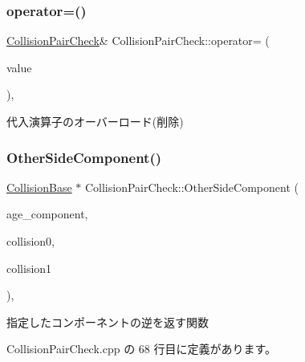 \subsubsection{\texorpdfstring{operator=()}{operator=()}}
{\footnotesize\ttfamily \mbox{\hyperlink{class_collision_pair_check}{Collision\+Pair\+Check}}\& Collision\+Pair\+Check\+::operator= (\begin{DoxyParamCaption}\item[{const \mbox{\hyperlink{class_collision_pair_check}{Collision\+Pair\+Check}} \&}]{value }\end{DoxyParamCaption})\hspace{0.3cm}{\ttfamily [private]}, {\ttfamily [delete]}}



代入演算子のオーバーロード(削除) 

\mbox{\label{class_collision_pair_check_a97c459f98bce9f88d9f506423395c40c}} 
\subsubsection{\texorpdfstring{Other\+Side\+Component()}{OtherSideComponent()}}
{\footnotesize\ttfamily \mbox{\hyperlink{class_collision_base}{Collision\+Base}} $\ast$ Collision\+Pair\+Check\+::\+Other\+Side\+Component (\begin{DoxyParamCaption}\item[{\mbox{\hyperlink{class_collision_base}{Collision\+Base}} $\ast$}]{age\+\_\+component,  }\item[{\mbox{\hyperlink{class_collision_base}{Collision\+Base}} $\ast$}]{collision0,  }\item[{\mbox{\hyperlink{class_collision_base}{Collision\+Base}} $\ast$}]{collision1 }\end{DoxyParamCaption})\hspace{0.3cm}{\ttfamily [static]}, {\ttfamily [private]}}



指定したコンポーネントの逆を返す関数 



 Collision\+Pair\+Check.\+cpp の 68 行目に定義があります。


